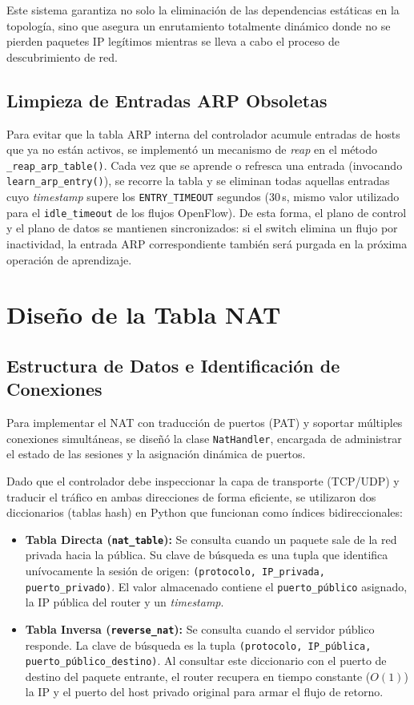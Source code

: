 \documentclass[11pt, a4paper]{article}
\begin{document}
Este sistema garantiza no solo la eliminación de las dependencias estáticas en la topología, sino que asegura un enrutamiento totalmente dinámico donde no se pierden paquetes IP legítimos mientras se lleva a cabo el proceso de descubrimiento de red.

\subsection{Limpieza de Entradas ARP Obsoletas}
Para evitar que la tabla ARP interna del controlador acumule entradas de hosts que ya no están activos, se implementó un mecanismo de \textit{reap} en el método \texttt{\_reap\_arp\_table()}. Cada vez que se aprende o refresca una entrada (invocando \texttt{learn\_arp\_entry()}), se recorre la tabla y se eliminan todas aquellas entradas cuyo \textit{timestamp} supere los \texttt{ENTRY\_TIMEOUT} segundos (30\,s, mismo valor utilizado para el \texttt{idle\_timeout} de los flujos OpenFlow). De esta forma, el plano de control y el plano de datos se mantienen sincronizados: si el switch elimina un flujo por inactividad, la entrada ARP correspondiente también será purgada en la próxima operación de aprendizaje.


\section{Diseño de la Tabla NAT}
\label{sec:diseno_tabla_nat}

\subsection{Estructura de Datos e Identificación de Conexiones}
Para implementar el NAT con traducción de puertos (PAT) y soportar múltiples conexiones simultáneas, se diseñó la clase \texttt{NatHandler}, encargada de administrar el estado de las sesiones y la asignación dinámica de puertos. 

Dado que el controlador debe inspeccionar la capa de transporte (TCP/UDP) y traducir el tráfico en ambas direcciones de forma eficiente, se utilizaron dos diccionarios (tablas hash) en Python que funcionan como índices bidireccionales:

\begin{itemize}
    \item \textbf{Tabla Directa (\texttt{nat\_table}):} Se consulta cuando un paquete sale de la red privada hacia la pública. Su clave de búsqueda es una tupla que identifica unívocamente la sesión de origen: \texttt{(protocolo, IP\_privada, puerto\_privado)}. El valor almacenado contiene el \texttt{puerto\_público} asignado, la IP pública del router y un \textit{timestamp}.
    \item \textbf{Tabla Inversa (\texttt{reverse\_nat}):} Se consulta cuando el servidor público responde. La clave de búsqueda es la tupla \texttt{(protocolo, IP\_pública, puerto\_público\_destino)}. Al consultar este diccionario con el puerto de destino del paquete entrante, el router recupera en tiempo constante ($O(1)$) la IP y el puerto del host privado original para armar el flujo de retorno.
\end{itemize}
\end{document}
